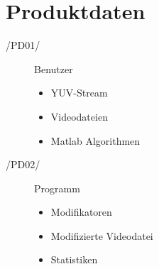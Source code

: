 \section{Produktdaten}

\begin{description}
  \item[/PD01/] Benutzer
    \begin{itemize}
      \item YUV-Stream
      \item Videodateien
      \item Matlab Algorithmen
    \end{itemize}
  \item[/PD02/] Programm
    \begin{itemize}
      \item Modifikatoren
      \item Modifizierte Videodatei
      \item Statistiken
    \end{itemize}
\end{description}
